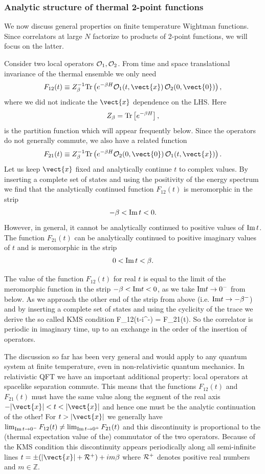 \subsubsection{Analytic structure of thermal 2-point functions}
\label{therman}

We now discuss general properties on finite temperature Wightman functions. Since correlators at large $N$ factorize to products of 2-point functions, we will focus on the latter. 

Consider two local operators ${\cal O}_1,{\cal O}_2$. From time and space translational invariance of the thermal ensemble we only need
\[
F_{12}(t) \equiv Z_{\beta}^{-1}{\rm Tr}\left(e^{-\beta H} {\cal O}_1(t,\vect{x}) \, {\cal O}_2(0,\vect{0})\right),
\]
where we did not indicate the $\vect{x}$ dependence on the LHS. Here 
\[
Z_{\beta} = {\rm Tr}\left[e^{-\beta H}\right],
\]
 is the partition function which will appear frequently below. Since the operators do not generally commute, we also have a related function
\[
F_{21}(t) \equiv Z_{\beta}^{-1}{\rm Tr}\left(e^{-\beta H} {\cal O}_2(0,\vect{0}) \, {\cal O}_1(t,\vect{x})\right).
\]
Let us keep $\vect{x}$ fixed and analytically continue $t$ to complex values. By inserting a complete set of states and using the positivity of the energy spectrum we find that the analytically continued function $F_{12}(t)$ is meromorphic in the strip
\[
-\beta<{\rm Im}\,t <0.
\]
However, in general, it cannot be analytically continued to positive values of ${\rm Im}\,t$.  The function $F_{21}(t)$ can be analytically continued to positive imaginary values of $t$ and is meromorphic in the strip 
\[
0<{\rm Im} \,t<\beta.
\]  

The value of the function $F_{12}(t)$ for real $t$ is equal to the limit of the meromorphic function in the strip $-\beta<{\rm Im}t <0$, as we take ${\rm Im} t \rightarrow 0^-$ from below. As we approach the other end of the strip from above (i.e. ${\rm Im}t \rightarrow -\beta^-$) and by inserting a complete set of states and using the cyclicity of the trace we derive the so called KMS condition
\be
\label{kms}
F_{12}(t-i\beta^-) = F_{21}(t).
\ee
So the correlator is periodic in imaginary time, up to an exchange in the order of the insertion of operators. 

The discussion so far has been very general and would apply to any quantum system at finite temperature, even in non-relativistic quantum mechanics. In relativistic QFT we have an important additional property: local operators at spacelike separation commute. This means that the functions $F_{12}(t)$ and $F_{21}(t)$ must have the same value along the segment of the real axis $-|\vect{x}|<t<|\vect{x}|$ and hence one must be the analytic continuation of the other! For $t>|\vect{x}|$ we generally have $\lim_{{\rm Im}\, t\rightarrow 0^-} F_{12}(t) \neq \lim_{{\rm Im}\, t\rightarrow 0^+} F_{21}(t)$ and this discontinuity is proportional to the (thermal expectation value of the) commutator of the two operators. Because of the KMS condition this discontinuity appears periodically along all semi-infinite lines $t = \pm (|\vect{x}| + {\cal R}^+) + i m \beta$ where ${\cal R}^+$ denotes positive real numbers and $m \in \mathbb{Z}$.

